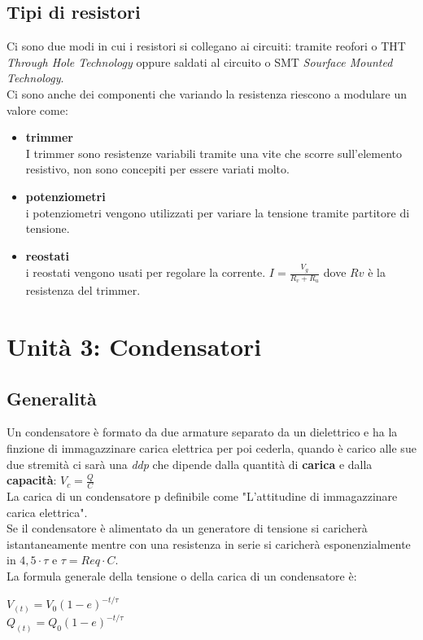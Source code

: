 \documentclass{article}
\begin{document}
\subsection{Tipi di resistori}
Ci sono due modi in cui i resistori si collegano ai circuiti: tramite reofori o THT \textit{Through Hole Technology} oppure saldati al circuito o SMT \textit{Sourface Mounted Technology}.
\vspace{1\baselineskip}
\\Ci sono anche dei componenti che variando la resistenza riescono a modulare un valore come:
\begin{itemize}
    \item \textbf{trimmer}\\
    I trimmer sono resistenze variabili tramite una vite che scorre sull'elemento resistivo, non sono concepiti per essere variati molto.
    \item \textbf{potenziometri}\\
    i potenziometri vengono utilizzati per variare la tensione tramite partitore di tensione.
    \item \textbf{reostati}\\
    i reostati vengono usati per regolare la corrente. $I=\frac{V_g}{R_v+R_u}$ dove $Rv$ è la resistenza del trimmer.
\end{itemize}

\section{Unità 3: Condensatori}
\subsection{Generalità}
Un condensatore è formato da due armature separato da un dielettrico e ha la finzione di immagazzinare carica elettrica per poi cederla, quando è carico alle sue due stremità ci sarà una \textit{ddp} che dipende dalla quantità di \textbf{carica} e dalla \textbf{capacità}: $V_c=\frac{Q}{C}$\\
La carica di un condensatore p definibile come "L'attitudine di immagazzinare carica elettrica".\\
Se il condensatore è alimentato da un generatore di tensione si caricherà istantaneamente mentre con una resistenza in serie si caricherà esponenzialmente in $4,5\cdot\tau$ e $\tau=Req\cdot C$.\\
La formula generale della tensione o della carica di un condensatore è:
\begin{center}
    $V_{(t)}=V_{0}(1-e)^{-t/\tau}$\\
    $Q_{(t)}=Q_{0}(1-e)^{-t/\tau}$
\end{center}
\end{document}
